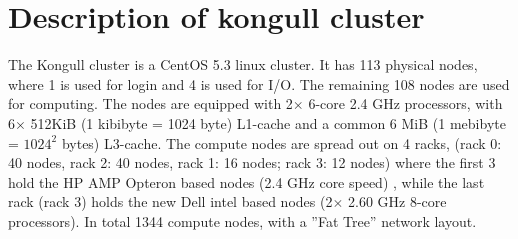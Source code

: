 \section{Description of kongull cluster}
The Kongull cluster is a CentOS 5.3 linux cluster. It has 113 physical nodes, 
where 1 is used for login and 4 is used for I/O. The remaining 108 nodes are 
used for computing. The nodes are equipped with 2$\times$ 6-core 2.4 GHz processors, with 6$\times$ 512KiB 
(1 kibibyte = 1024 byte) L1-cache and a common 6 MiB (1 mebibyte = $1024^2$ bytes) L3-cache.
The compute nodes are spread out on 4 racks, 
(rack 0: 40 nodes, rack 2: 40 nodes, rack 1: 16 nodes; rack 3: 12 nodes) 
where the first 3 hold the HP AMP Opteron based nodes (2.4 GHz core speed) 
, while the last rack 
(rack 3) holds the new Dell intel based nodes (2$\times$ 2.60 GHz 8-core processors). In total 1344 compute nodes, with a ''Fat Tree'' network layout.


